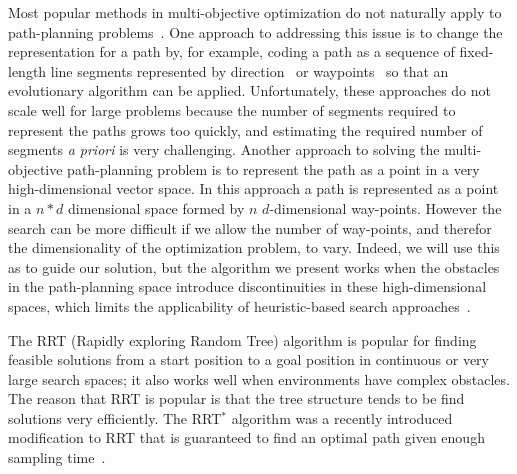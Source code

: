 \documentclass{article}
\begin{document}
Most popular methods in multi-objective optimization do not naturally apply to path-planning problems~\cite{4358754,6600851}.
One approach to addressing this issue is to change the representation for a path by, for example, coding a path as a sequence of fixed-length line segments represented by direction~\cite{Ahmed2013,howlett2006learning} or waypoints~\cite{5160222,Pires2004}
so that an evolutionary algorithm can be applied.  
Unfortunately, these approaches do not scale well for large problems because the number of segments required to represent the paths grows too quickly, and estimating the required number of segments {\em a priori} is very challenging.  
Another approach to solving the multi-objective path-planning problem is to represent the path as a point in a very high-dimensional vector space. 
In this approach a path is represented as a point in a $ n * d $ dimensional space formed by $ n $ $ d $-dimensional way-points.
However the search can be more difficult if we allow the number of way-points, and therefor the dimensionality of the optimization problem, to vary.
Indeed, we will use this as to guide our solution, but the algorithm we present works when the obstacles in the path-planning space introduce discontinuities in these high-dimensional spaces, which limits the applicability of heuristic-based search approaches~\cite{5160222,4358754}.

The RRT (Rapidly exploring Random Tree) algorithm is popular for finding feasible solutions from a start position to a goal position in continuous or very large search spaces; it also works well when environments have complex obstacles. 
The reason that RRT is popular is that the tree structure tends to be find solutions very efficiently.
The RRT$^{*}$ algorithm was a recently introduced modification to RRT that is guaranteed to find an optimal path given enough sampling time~\cite{Karaman:2011:SAO:2000201.2000209,Karaman.Frazzoli:RSS10}.
\end{document}
